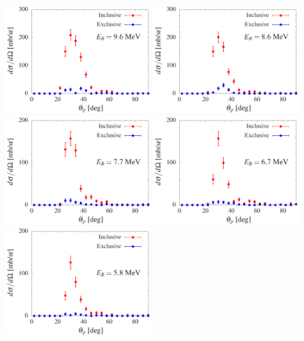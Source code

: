 \documentclass[aps,prc,onecolumn,amsmath,amssymb, preprint, 12pt]{revtex4-1}
\begin{document}
\begin{figure}[!ht]
\centering
\includegraphics[width=0.49\textwidth]{ad_250.eps}
\includegraphics[width=0.49\textwidth]{ad_260.eps}\\
\includegraphics[width=0.49\textwidth]{ad_270.eps}
\includegraphics[width=0.49\textwidth]{ad_280.eps}\\
\includegraphics[width=0.49\textwidth]{ad_290.eps}

\end{figure}
\end{document}
